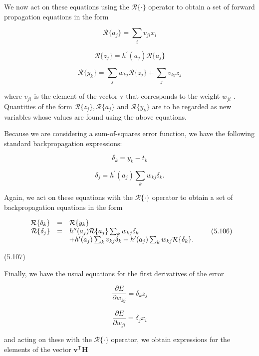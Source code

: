 \documentclass[
  10
]{article}
\begin{document}
We now act on these equations using the \(\mathcal { R } \{ \cdot \}\)
operator to obtain a set of forward propagation equations in the form

\[
\mathcal {R} \{a _ {j} \} = \sum_ {i} v _ {j i} x _ {i}\tag{5.101}
\]

\[
\mathcal {R} \{z _ {j} \} = h ^ {\prime} (a _ {j}) \mathcal {R} \{a _ {j} \}\tag{5.102}
\]

\[
\mathcal {R} \{y _ {k} \} = \sum_ {j} w _ {k j} \mathcal {R} \{z _ {j} \} + \sum_ {j} v _ {k j} z _ {j}\tag{5.103}
\]

where \(v _ { j i }\) is the element of the vector v that corresponds to
the weight \(w _ { j i }\) . Quantities of the form
\({ \mathcal { R } } \{ z _ { j } \} , { \mathcal { R } } \{ a _ { j } \}\)
and \(\mathcal { R } \{ y _ { k } \}\) are to be regarded as new
variables whose values are found using the above equations.

Because we are considering a sum-of-squares error function, we have the
following standard backpropagation expressions:

\[
{\delta_ {k}} = {y _ {k} - t _ {k}}\tag{5.104}
\]

\[
\delta_ {j} = h ^ {\prime} (a _ {j}) \sum_ {k} w _ {k j} \delta_ {k}.\tag{5.105}
\]

Again, we act on these equations with the \(\mathcal { R } \{ \cdot \}\)
operator to obtain a set of backpropagation equations in the form

\[
\begin{array}{r c l} \mathcal {R} \{\delta_ {k} \} & = & \mathcal {R} \{y _ {k} \} \\ \mathcal {R} \{\delta_ {j} \} & = & h ^ {\prime \prime} (a _ {j}) \mathcal {R} \{a _ {j} \} \sum_ {k} w _ {k j} \delta_ {k} \\ & & + h ^ {\prime} (a _ {j}) \sum_ {k} v _ {k j} \delta_ {k} + h ^ {\prime} (a _ {j}) \sum_ {k} w _ {k j} \mathcal {R} \{\delta_ {k} \}. \end{array}\tag{5.106}
\]

(5.107)

Finally, we have the usual equations for the first derivatives of the
error

\[
{\frac {\partial E}{\partial w _ {k j}}} = {\delta_ {k} z _ {j}}\tag{5.108}
\]

\[
{\frac {\partial E}{\partial w _ {j i}}} = {\delta_ {j} x _ {i}}\tag{5.109}
\]

and acting on these with the \(\mathcal { R } \{ \cdot \}\) operator, we
obtain expressions for the elements of the vector
\(\mathbf { v } ^ { \mathrm { T } } \mathbf { H }\)
\end{document}
